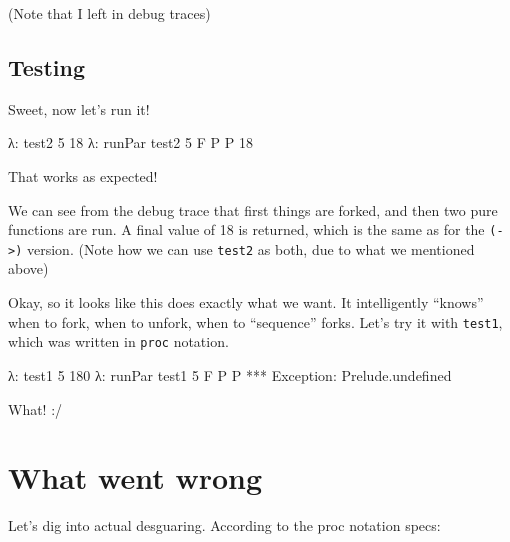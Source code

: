 \documentclass[]{article}
\newenvironment{Shaded}{}{}
\newcommand{\DataTypeTok}[1]{\textcolor[rgb]{0.56,0.13,0.00}{{#1}}}
\newcommand{\DecValTok}[1]{\textcolor[rgb]{0.25,0.63,0.44}{{#1}}}
\newcommand{\FunctionTok}[1]{\textcolor[rgb]{0.02,0.16,0.49}{{#1}}}
\newcommand{\NormalTok}[1]{{#1}}
\begin{document}
(Note that I left in debug traces)

\subsection{Testing}\label{testing}

Sweet, now let's run it!

\begin{Shaded}
\begin{Highlighting}[]
\NormalTok{λ}\FunctionTok{:} \NormalTok{test2 }\DecValTok{5}
\DecValTok{18}
\NormalTok{λ}\FunctionTok{:} \NormalTok{runPar test2 }\DecValTok{5}
\DataTypeTok{F}
\DataTypeTok{P}
\DataTypeTok{P}
\DecValTok{18}
\end{Highlighting}
\end{Shaded}

That works as expected!

We can see from the debug trace that first things are forked, and then
two pure functions are run. A final value of 18 is returned, which is
the same as for the \texttt{(-\textgreater{})} version. (Note how we can
use \texttt{test2} as both, due to what we mentioned above)

Okay, so it looks like this does exactly what we want. It intelligently
``knows'' when to fork, when to unfork, when to ``sequence'' forks.
Let's try it with \texttt{test1}, which was written in \texttt{proc}
notation.

\begin{Shaded}
\begin{Highlighting}[]
\NormalTok{λ}\FunctionTok{:} \NormalTok{test1 }\DecValTok{5}
\DecValTok{180}
\NormalTok{λ}\FunctionTok{:} \NormalTok{runPar test1 }\DecValTok{5}
\DataTypeTok{F}
\DataTypeTok{P}
\DataTypeTok{P}
\FunctionTok{***} \DataTypeTok{Exception}\FunctionTok{:} \NormalTok{Prelude.undefined}
\end{Highlighting}
\end{Shaded}

What! :/

\section{What went wrong}\label{what-went-wrong}

Let's dig into actual desguaring. According to the proc notation specs:
\end{document}
